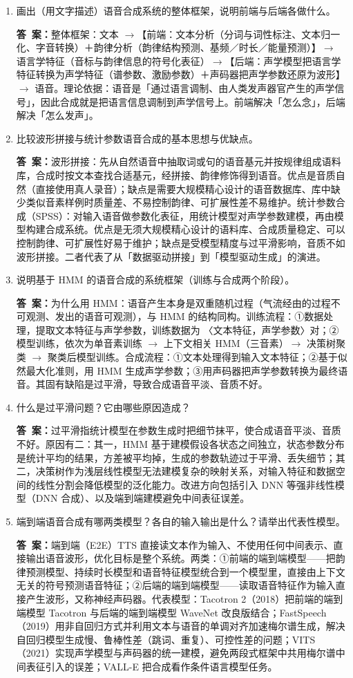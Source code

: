 \documentclass[10.5pt]{ctexart}
\newenvironment{qlist}
  {\begin{enumerate}[label={\sffamily\bfseries\color{accent}\arabic*.},leftmargin=2.4em,labelsep=0.55em,itemsep=0.62em,topsep=0.15em,parsep=0.3em,partopsep=0pt]}
  {\end{enumerate}}
\newcommand{\anslabel}{{\sffamily\bfseries\color{accent}答\ 案：}\hspace{0.35em}}
\newcommand{\ansL}[1]{\par\vspace{3.6\baselineskip}\begin{ansbox}\anslabel #1\end{ansbox}}
\begin{document}
\begin{qlist}

\item 画出（用文字描述）语音合成系统的整体框架，说明前端与后端各做什么。
\ansL{整体框架：文本 $\to$【前端：文本分析（分词与词性标注、文本归一化、字音转换）＋韵律分析（韵律结构预测、基频／时长／能量预测）】$\to$ 语言学特征（音标与韵律信息的符号化表征）$\to$【后端：声学模型把语言学特征转换为声学特征（谱参数、激励参数）＋声码器把声学参数还原为波形】$\to$ 语音。理论依据：语音是「通过语言调制、由人类发声器官产生的声学信号」，因此合成就是把语言信息调制到声学信号上。前端解决「怎么念」，后端解决「怎么发声」。}

\item 比较波形拼接与统计参数语音合成的基本思想与优缺点。
\ansL{波形拼接：先从自然语音中抽取词或句的语音基元并按规律组成语料库，合成时按文本查找合适基元，经拼接、韵律修饰得到语音。优点是音质自然（直接使用真人录音）；缺点是需要大规模精心设计的语音数据库、库中缺少类似音素样例时质量差、不易控制韵律、可扩展性差不易维护。统计参数合成（SPSS）：对输入语音做参数化表征，用统计模型对声学参数建模，再由模型构建合成系统。优点是无须大规模精心设计的语料库、合成质量稳定、可以控制韵律、可扩展性好易于维护；缺点是受模型精度与过平滑影响，音质不如波形拼接。二者代表了从「数据驱动拼接」到「模型驱动生成」的演进。}

\item 说明基于 HMM 的语音合成的系统框架（训练与合成两个阶段）。
\ansL{为什么用 HMM：语音产生本身是双重随机过程（气流经由的过程不可观测、发出的语音可观测），与 HMM 的结构同构。训练流程：①数据处理，提取文本特征与声学参数，训练数据为 〈文本特征，声学参数〉对；②模型训练，依次为单音素训练 $\to$ 上下文相关 HMM（三音素）$\to$ 决策树聚类 $\to$ 聚类后模型训练。合成流程：①文本处理得到输入文本特征；②基于似然最大化准则，用 HMM 生成声学参数；③用声码器把声学参数转换为最终语音。其固有缺陷是过平滑，导致合成语音平淡、音质不好。}

\item 什么是过平滑问题？它由哪些原因造成？
\ansL{过平滑指统计模型在参数生成时把细节抹平，使合成语音平淡、音质不好。原因有二：其一，HMM 基于建模假设各状态之间独立，状态参数分布是统计平均的结果，方差被平均掉，生成的参数轨迹过于平滑、丢失细节；其二，决策树作为浅层线性模型无法建模复杂的映射关系，对输入特征和数据空间的线性分割会降低模型的泛化能力。改进方向包括引入 DNN 等强非线性模型（DNN 合成）、以及端到端建模避免中间表征误差。}

\item 端到端语音合成有哪两类模型？各自的输入输出是什么？请举出代表性模型。
\ansL{端到端（E2E）TTS 直接读文本作为输入、不使用任何中间表示、直接输出语音波形，优化目标是整个系统。两类：①前端的端到端模型——把韵律预测模型、持续时长模型和语音特征模型统合到一个模型里，直接由上下文无关的符号预测语音特征；②后端的端到端模型——读取语音特征作为输入直接产生波形，又称神经声码器。代表模型：Tacotron 2（2018）把前端的端到端模型 Tacotron 与后端的端到端模型 WaveNet 改良版结合；FastSpeech（2019）用非自回归方式并利用文本与语音的单调对齐加速梅尔谱生成，解决自回归模型生成慢、鲁棒性差（跳词、重复）、可控性差的问题；VITS（2021）实现声学模型与声码器的统一建模，避免两段式框架中共用梅尔谱中间表征引入的误差；VALL-E 把合成看作条件语言模型任务。}

\end{qlist}
\end{document}
